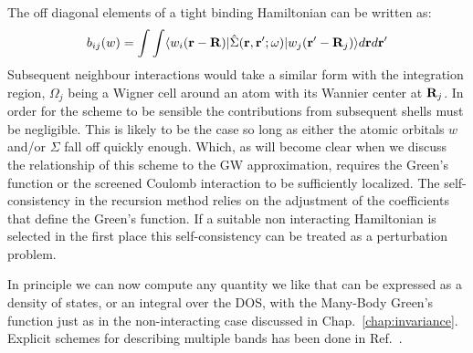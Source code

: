 The off diagonal elements of a tight binding Hamiltonian can be written as:
%
\begin{equation}
b_{ij}(w) = \int\int\langle w_{i}({\bf r}-{\bf R})|\hat{\Sigma}({\bf r},{\bf r}';\omega)|w_{j}({\bf r}'-{\bf R}_{j})\rangle d{\bf r} d{\bf r}'
\end{equation}
%
	Subsequent neighbour interactions would take a similar form
with the integration region, $\Omega_{j}$ being a Wigner cell around an 
atom with its Wannier center at ${\bf R}_j$. In order for the scheme to be sensible 
the contributions from subsequent shells must be negligible. This is likely 
to be the case so long as either the atomic orbitals $w$ and/or $\Sigma$ 
fall off quickly enough. Which, as will become clear when we discuss
the relationship of this scheme to the GW approximation, requires 
the Green's function or the screened Coulomb interaction to be sufficiently localized.
%
The self-consistency in the recursion method relies on the adjustment of the coefficients that
define the Green's function. If a suitable non interacting Hamiltonian is selected in the first
place this self-consistency can be treated as a perturbation problem.

In principle we can now compute any quantity we like that can be expressed
as a density of states, or an integral over the DOS, with the Many-Body Green's 
function just as in the non-interacting case discussed in Chap.~\ref{chap:invariance}.
Explicit schemes for describing multiple bands has been done in Ref.~\cite{haydock10}.

%
%
%

